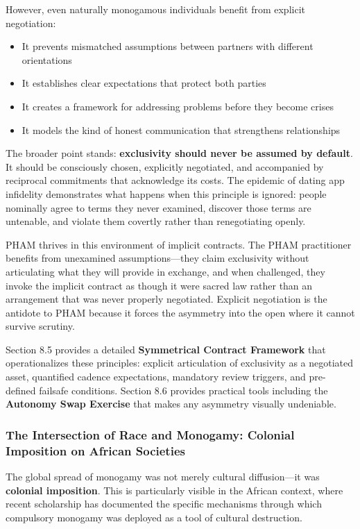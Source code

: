 \documentclass[12pt, letterpaper]{article}
\begin{document}
However, even naturally monogamous individuals benefit from explicit negotiation:
\begin{itemize}
    \item It prevents mismatched assumptions between partners with different orientations
    \item It establishes clear expectations that protect both parties
    \item It creates a framework for addressing problems before they become crises
    \item It models the kind of honest communication that strengthens relationships
\end{itemize}

The broader point stands: \textbf{exclusivity should never be assumed by default}. It should be consciously chosen, explicitly negotiated, and accompanied by reciprocal commitments that acknowledge its costs. The epidemic of dating app infidelity demonstrates what happens when this principle is ignored: people nominally agree to terms they never examined, discover those terms are untenable, and violate them covertly rather than renegotiating openly.

PHAM thrives in this environment of implicit contracts. The PHAM practitioner benefits from unexamined assumptions---they claim exclusivity without articulating what they will provide in exchange, and when challenged, they invoke the implicit contract as though it were sacred law rather than an arrangement that was never properly negotiated. Explicit negotiation is the antidote to PHAM because it forces the asymmetry into the open where it cannot survive scrutiny.

Section 8.5 provides a detailed \textbf{Symmetrical Contract Framework} that operationalizes these principles: explicit articulation of exclusivity as a negotiated asset, quantified cadence expectations, mandatory review triggers, and pre-defined failsafe conditions. Section 8.6 provides practical tools including the \textbf{Autonomy Swap Exercise} that makes any asymmetry visually undeniable.

\subsubsection{The Intersection of Race and Monogamy: Colonial Imposition on African Societies}

The global spread of monogamy was not merely cultural diffusion---it was \textbf{colonial imposition}. This is particularly visible in the African context, where recent scholarship has documented the specific mechanisms through which compulsory monogamy was deployed as a tool of cultural destruction.
\end{document}
